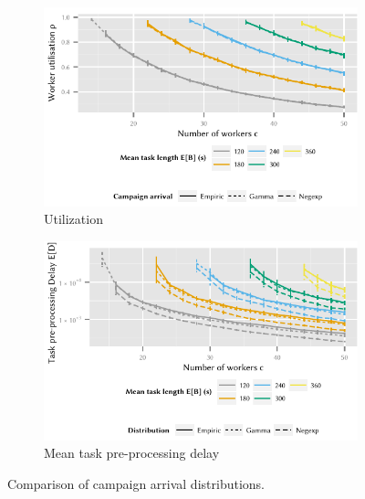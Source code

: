 \begin{figure}
	\centering
	\begin{subfigure}{\columnwidth}
		\includegraphics{cloud/crowdsourcing/measurements/figures/distribution_utilization}
		\caption{Utilization \workerUtilization}
		\label{fig:cloud:crowdsourcing:measurements:comparison:distribution:utilization}
	\end{subfigure}

	\begin{subfigure}{\columnwidth}
		\includegraphics{cloud/crowdsourcing/measurements/figures/distribution_task_delay}
		\caption{Mean task pre-processing delay \preTaskProcessingDelay}
		\label{fig:cloud:crowdsourcing:measurements:comparison:distribution:task_delay}
	\end{subfigure}
	\caption{Comparison of campaign arrival distributions.}
	\label{fig:cloud:crowdsourcing:measurements:comparison:distribution}
\end{figure}

